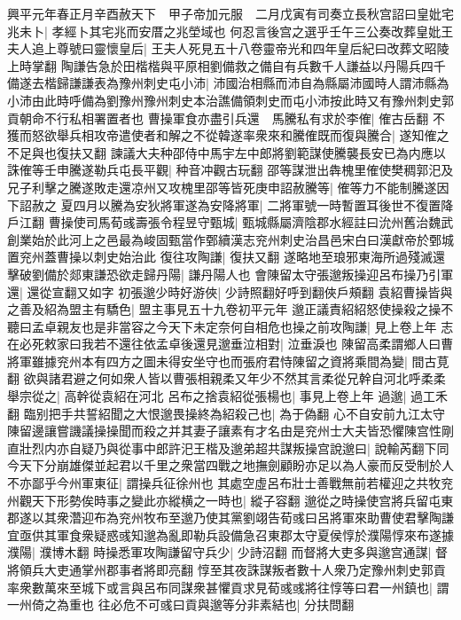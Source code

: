 興平元年春正月辛酉赦天下　甲子帝加元服　二月戊寅有司奏立長秋宫詔曰皇妣宅兆未卜|{
	孝經卜其宅兆而安厝之兆塋域也}
何忍言後宫之選乎壬午三公奏改葬皇妣王夫人追上尊號曰靈懷皇后|{
	王夫人死見五十八卷靈帝光和四年皇后紀曰改葬文昭陵上時掌翻}
陶謙告急於田楷楷與平原相劉備救之備自有兵數千人謙益以丹陽兵四千備遂去楷歸謙謙表為豫州刺史屯小沛|{
	沛國治相縣而沛自為縣屬沛國時人謂沛縣為小沛由此時呼備為劉豫州豫州刺史本治譙備領刺史而屯小沛按此時又有豫州刺史郭貢朝命不行私相署置者也}
曹操軍食亦盡引兵還　馬騰私有求於李傕|{
	傕古岳翻}
不獲而怒欲舉兵相攻帝遣使者和解之不從韓遂率衆來和騰傕既而復與騰合|{
	遂知傕之不足與也復扶又翻}
諫議大夫种邵侍中馬宇左中郎將劉範謀使騰襲長安已為内應以誅傕等壬申騰遂勒兵屯長平觀|{
	种音冲觀古玩翻}
邵等謀泄出犇槐里傕使樊稠郭汜及兄子利擊之騰遂敗走還凉州又攻槐里邵等皆死庚申詔赦騰等|{
	傕等力不能制騰遂因下詔赦之}
夏四月以騰為安狄將軍遂為安降將軍|{
	二將軍號一時暫置耳後世不復置降戶江翻}
曹操使司馬荀彧壽張令程昱守甄城|{
	甄城縣屬濟陰郡水經註曰沇州舊治魏武創業始於此河上之邑最為峻固甄當作鄄續漢志兖州刺史治昌邑宋白曰漢獻帝於鄄城置兖州蓋曹操以刺史始治此}
復往攻陶謙|{
	復扶又翻}
遂略地至琅邪東海所過殘滅還擊破劉備於郯東謙恐欲走歸丹陽|{
	謙丹陽人也}
會陳留太守張邈叛操迎呂布操乃引軍還|{
	還從宣翻又如字}
初張邈少時好游俠|{
	少詩照翻好呼到翻俠戶頰翻}
袁紹曹操皆與之善及紹為盟主有驕色|{
	盟主事見五十九卷初平元年}
邈正議責紹紹怒使操殺之操不聽曰孟卓親友也是非當容之今天下未定奈何自相危也操之前攻陶謙|{
	見上卷上年}
志在必死敕家曰我若不還往依孟卓後還見邈垂泣相對|{
	泣垂淚也}
陳留高柔謂鄉人曰曹將軍雖據兖州本有四方之圖未得安坐守也而張府君恃陳留之資將乘間為變|{
	間古莧翻}
欲與諸君避之何如衆人皆以曹張相親柔又年少不然其言柔從兄幹自河北呼柔柔舉宗從之|{
	高幹從袁紹在河北}
呂布之捨袁紹從張楊也|{
	事見上卷上年}
過邈|{
	過工禾翻}
臨别把手共誓紹聞之大恨邈畏操終為紹殺己也|{
	為于偽翻}
心不自安前九江太守陳留邊讓嘗譏議操操聞而殺之并其妻子讓素有才名由是兖州士大夫皆恐懼陳宫性剛直壯烈内亦自疑乃與從事中郎許汜王楷及邈弟超共謀叛操宫說邈曰|{
	說輸芮翻下同}
今天下分崩雄傑並起君以千里之衆當四戰之地撫劍顧盼亦足以為人豪而反受制於人不亦鄙乎今州軍東征|{
	謂操兵征徐州也}
其處空虛呂布壯士善戰無前若權迎之共牧兖州觀天下形勢俟時事之變此亦縱横之一時也|{
	縱子容翻}
邈從之時操使宫將兵留屯東郡遂以其衆濳迎布為兖州牧布至邈乃使其黨劉翊告荀彧曰呂將軍來助曹使君擊陶謙宜亟供其軍食衆疑惑彧知邈為亂即勒兵設備急召東郡太守夏侯惇於濮陽惇來布遂據濮陽|{
	濮博木翻}
時操悉軍攻陶謙留守兵少|{
	少詩沼翻}
而督將大吏多與邈宫通謀|{
	督將領兵大吏通掌州郡事者將即亮翻}
惇至其夜誅謀叛者數十人衆乃定豫州刺史郭貢率衆數萬來至城下或言與呂布同謀衆甚懼貢求見荀彧彧將往惇等曰君一州鎮也|{
	謂一州倚之為重也}
往必危不可彧曰貢與邈等分非素結也|{
	分扶問翻}

